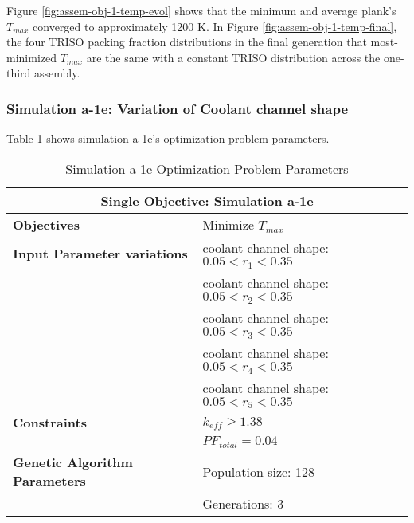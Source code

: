 Figure \ref{fig:assem-obj-1-temp-evol} shows that the minimum and average plank's 
$T_{max}$ converged to approximately 1200 K.
In Figure \ref{fig:assem-obj-1-temp-final}, the four TRISO packing fraction distributions 
in the final generation that most-minimized $T_{max}$ are the same with a constant 
TRISO distribution across the one-third assembly.

\subsubsection{Simulation a-1e: Variation of Coolant channel shape}
Table \ref{tab:simulationa1e} shows simulation a-1e's optimization problem parameters. 
\begin{table}[htbp!]
    \centering
    \onehalfspacing
    \caption{Simulation a-1e Optimization Problem Parameters}
	\label{tab:simulationa1e}
    \footnotesize
    \begin{tabular}{l|p{6cm}}
    \hline 
    \multicolumn{2}{c}{\textbf{Single Objective: Simulation a-1e}} \\
    \hline 
    \textbf{Objectives} & Minimize $T_{max}$ \\
    \hline 
    \textbf{Input Parameter variations} 
    & coolant channel shape: $0.05<r_{1}<0.35$ \\
    & coolant channel shape: $0.05<r_{2}<0.35$ \\
    & coolant channel shape: $0.05<r_{3}<0.35$ \\
    & coolant channel shape: $0.05<r_{4}<0.35$ \\
    & coolant channel shape: $0.05<r_{5}<0.35$ \\
    \hline
    \textbf{Constraints} & $k_{eff} \geq 1.38$\\ 
    & $PF_{total} = 0.04 $\\ 
    \hline 
    \textbf{Genetic Algorithm Parameters} & Population size: 128 \\
    & Generations: 3 \\
    \hline
    \end{tabular}
\end{table}

